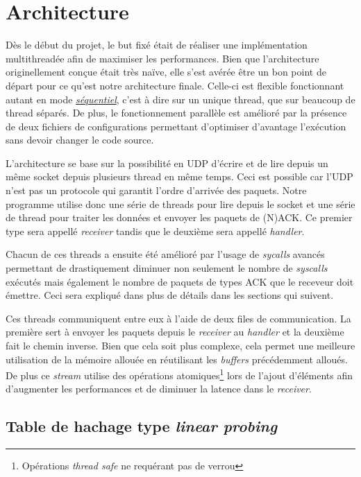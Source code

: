 \documentclass[../main.tex]{subfiles}
\begin{document}
\section{Architecture}
\label{sec:architecture}

Dès le début du projet, le but fixé était de réaliser une implémentation multithreadée afin de maximiser les performances. Bien que l'architecture 
 originellement conçue était très naïve, elle s'est avérée être un bon point de départ pour ce qu'est notre architecture finale. Celle-ci est flexible
fonctionnant autant en mode \hyperref[sec:sequential]{\textit{séquentiel}}, c'est à dire sur un unique thread, que sur beaucoup de thread séparés. De plus, le fonctionnement parallèle
est amélioré par la présence de deux fichiers de configurations permettant d'optimiser d'avantage l'exécution sans devoir changer le code source.

L'architecture se base sur la possibilité en UDP d'écrire et de lire depuis un même socket depuis plusieurs thread en même temps. Ceci est possible car l'UDP
n'est pas un protocole qui garantit l'ordre d'arrivée des paquets. Notre programme utilise donc une série de threads pour lire depuis le socket et une série
de thread pour traiter les données et envoyer les paquets de (N)ACK. Ce premier type sera appellé \textit{receiver} tandis que le deuxième sera appellé \textit{handler}.

Chacun de ces threads a ensuite été amélioré par l'usage de \textit{sycalls} avancés permettant de drastiquement diminuer non seulement le nombre de \textit{syscalls}
exécutés mais également le nombre de paquets de types ACK que le receveur doit émettre. Ceci sera expliqué dans plus de détails dans les sections
qui suivent.

Ces threads communiquent entre eux à l'aide de deux files de communication. La première sert à envoyer les paquets depuis le \textit{receiver} au \textit{handler}
et la deuxième fait le chemin inverse. Bien que cela soit plus complexe, cela permet une meilleure utilisation de la mémoire allouée en réutilisant les
\textit{buffers} précédemment alloués. De plus ce \textit{stream} utilise des opérations atomiques\footnote{ Opérations \textit{thread safe} ne requérant pas de verrou}
lors de l'ajout d'éléments afin d'augmenter les performances et de diminuer la latence dans le \textit{receiver}.

\subsection{Table de hachage type \textit{linear probing}}
\label{sec:hash_table}
\end{document}
